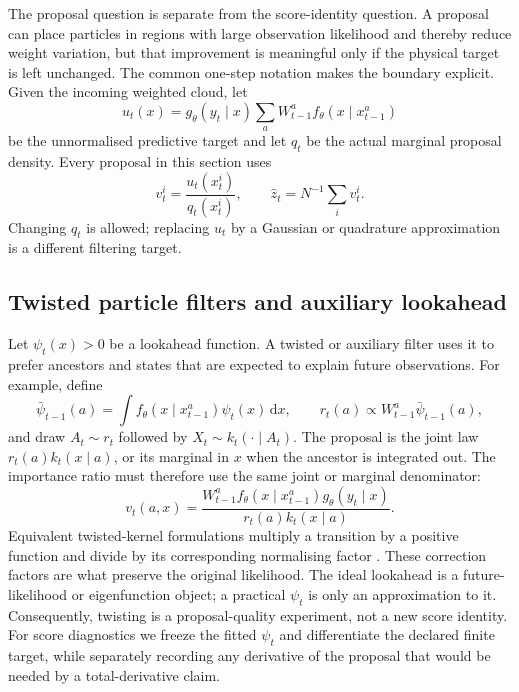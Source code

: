 \documentclass[11pt]{article}
\newcommand{\dd}{\mathrm{d}}
\begin{document}
The proposal question is separate from the score-identity question. A proposal
can place particles in regions with large observation likelihood and thereby
reduce weight variation, but that improvement is meaningful only if the
physical target is left unchanged. The common one-step notation makes the
boundary explicit. Given the incoming weighted cloud, let
\begin{equation}
 u_t(x)=g_\theta(y_t\mid x)\sum_a W_{t-1}^a
                 f_\theta(x\mid x_{t-1}^a)
\end{equation}
be the unnormalised predictive target and let $q_t$ be the actual marginal
proposal density. Every proposal in this section uses
\begin{equation}
 v_t^i=\frac{u_t(x_t^i)}{q_t(x_t^i)},\qquad
 \widehat z_t=N^{-1}\sum_i v_t^i.                 \label{eq:proposal-branch-weight}
\end{equation}
Changing $q_t$ is allowed; replacing $u_t$ by a Gaussian or quadrature
approximation is a different filtering target.

\subsection{Twisted particle filters and auxiliary lookahead}

Let $\psi_t(x)>0$ be a lookahead function. A twisted or auxiliary filter uses
it to prefer ancestors and states that are expected to explain future
observations. For example, define
\begin{equation}
 \bar\psi_{t-1}(a)=\int f_\theta(x\mid x_{t-1}^a)\psi_t(x)\,\dd x,
 \qquad
 r_t(a)\propto W_{t-1}^a\bar\psi_{t-1}(a),
 \label{eq:twist-ancestor}
\end{equation}
and draw $A_t\sim r_t$ followed by $X_t\sim k_t(\cdot\mid A_t)$.
The proposal is the joint law $r_t(a)k_t(x\mid a)$, or its marginal in $x$
when the ancestor is integrated out. The importance ratio must therefore use
the same joint or marginal denominator:
\begin{equation}
 v_t(a,x)=
 \frac{W_{t-1}^a f_\theta(x\mid x_{t-1}^a)g_\theta(y_t\mid x)}
      {r_t(a)k_t(x\mid a)}.                       \label{eq:twist-correction}
\end{equation}
Equivalent twisted-kernel formulations multiply a transition by a positive
function and divide by its corresponding normalising factor
\citep{whiteley2014twisted}. These correction factors are what preserve the
original likelihood. The ideal lookahead is a future-likelihood or eigenfunction
object; a practical $\psi_t$ is only an approximation to it. Consequently,
twisting is a proposal-quality experiment, not a new score identity. For
score diagnostics we freeze the fitted $\psi_t$ and differentiate the declared
finite target, while separately recording any derivative of the proposal that
would be needed by a total-derivative claim.
\end{document}
